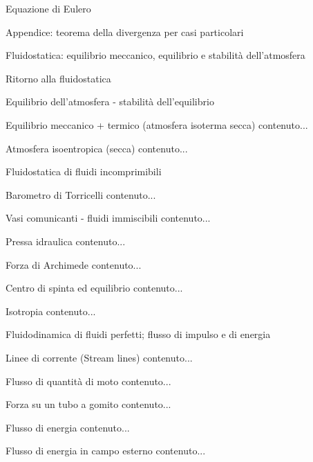 \documentclass[a4paper,11pt]{report}
\begin{document}
	\begin{chapter}{Equazione di Eulero}
		\begin{section}{Appendice: teorema della divergenza per casi particolari}
		\end{section}
	\end{chapter}

	\begin{chapter}{Fluidostatica: equilibrio meccanico, equilibrio e stabilità dell'atmosfera}
		\begin{section}{Ritorno alla fluidostatica}
		\end{section}
		\begin{section}{Equilibrio dell'atmosfera - stabilità dell'equilibrio}
			\begin{subsection}{Equilibrio meccanico + termico (atmosfera isoterma secca)}
				contenuto...
			\end{subsection}
			\begin{subsection}{Atmosfera isoentropica (secca)}
				contenuto...
			\end{subsection}
		\end{section}
	\end{chapter}

	\begin{chapter}{Fluidostatica di fluidi incomprimibili}
		\begin{section}{Barometro di Torricelli}
			contenuto...
		\end{section}
		\begin{section}{Vasi comunicanti - fluidi immiscibili}
			contenuto...
		\end{section}
		\begin{section}{Pressa idraulica}
			contenuto...
		\end{section}
		\begin{section}{Forza di Archimede}
			contenuto...
		\end{section}
		\begin{section}{Centro di spinta ed equilibrio}
			contenuto...
		\end{section}
		\begin{section}{Isotropia}
			contenuto...
		\end{section}
	\end{chapter}

	\begin{chapter}{Fluidodinamica di fluidi perfetti; flusso di impulso e di energia}
		\begin{section}{Linee di corrente (Stream lines)}
			contenuto...
		\end{section}
		\begin{section}{Flusso di quantità di moto}
			contenuto...
		\end{section}
		\begin{section}{Forza su un tubo a gomito}
			contenuto...
		\end{section}
		\begin{section}{Flusso di energia}
			contenuto...
		\end{section}
		\begin{subsection}{Flusso di energia in campo esterno}
			contenuto...
		\end{subsection}
	\end{chapter}
\end{document}
